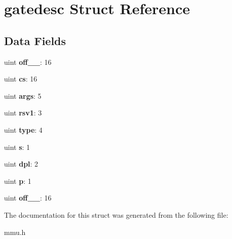\hypertarget{structgatedesc}{}\section{gatedesc Struct Reference}
\label{structgatedesc}
\subsection*{Data Fields}
\begin{DoxyCompactItemize}
\item 
uint {\bfseries off\+\_\+\_}\+: 16\hypertarget{structgatedesc_a4f7268ba32b6a8b3963aa6d23e51af59}{}\label{structgatedesc_a4f7268ba32b6a8b3963aa6d23e51af59}

\item 
uint {\bfseries cs}\+: 16\hypertarget{structgatedesc_a53e768c461dce9cc97048e7d19351af1}{}\label{structgatedesc_a53e768c461dce9cc97048e7d19351af1}

\item 
uint {\bfseries args}\+: 5\hypertarget{structgatedesc_a9b41bea284fe0922c440f4c253e926ff}{}\label{structgatedesc_a9b41bea284fe0922c440f4c253e926ff}

\item 
uint {\bfseries rsv1}\+: 3\hypertarget{structgatedesc_ad11779f5ce40e53a8feb3dfdaf3f0ee5}{}\label{structgatedesc_ad11779f5ce40e53a8feb3dfdaf3f0ee5}

\item 
uint {\bfseries type}\+: 4\hypertarget{structgatedesc_a41d6e5fb9bb27699bdb7d729c67ff32c}{}\label{structgatedesc_a41d6e5fb9bb27699bdb7d729c67ff32c}

\item 
uint {\bfseries s}\+: 1\hypertarget{structgatedesc_a54d731df342be3a775cc847a3dab1a53}{}\label{structgatedesc_a54d731df342be3a775cc847a3dab1a53}

\item 
uint {\bfseries dpl}\+: 2\hypertarget{structgatedesc_a4c62f5618440769c78ed976cae23c13d}{}\label{structgatedesc_a4c62f5618440769c78ed976cae23c13d}

\item 
uint {\bfseries p}\+: 1\hypertarget{structgatedesc_a5f754b650dc96be286cbc74e69da6a81}{}\label{structgatedesc_a5f754b650dc96be286cbc74e69da6a81}

\item 
uint {\bfseries off\+\_\+\_}\+: 16\hypertarget{structgatedesc_af388a77c8f2a8a8c0bd1ca74a7dbaef7}{}\label{structgatedesc_af388a77c8f2a8a8c0bd1ca74a7dbaef7}

\end{DoxyCompactItemize}


The documentation for this struct was generated from the following file\+:\begin{DoxyCompactItemize}
\item 
mmu.\+h\end{DoxyCompactItemize}
